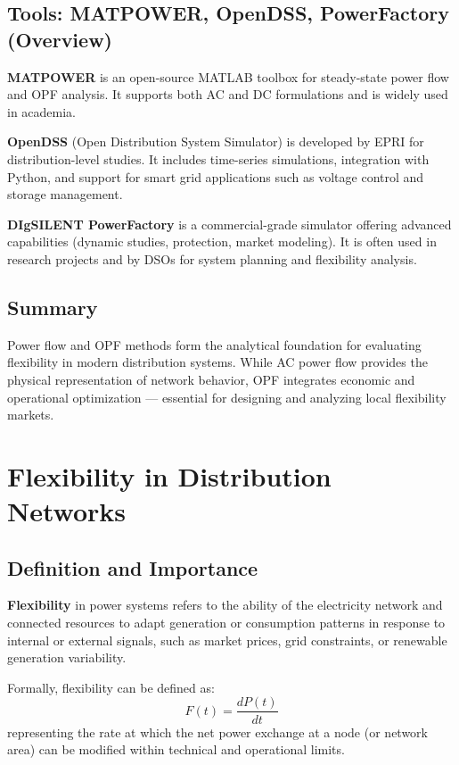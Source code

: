 \documentclass[11pt]{article}
\begin{document}
	\subsection{Tools: MATPOWER, OpenDSS, PowerFactory (Overview)}
	
	\textbf{MATPOWER} \cite{zimmerman2011matpower} is an open-source MATLAB toolbox for steady-state power flow and OPF analysis.  
	It supports both AC and DC formulations and is widely used in academia.
	
	\textbf{OpenDSS} (Open Distribution System Simulator) is developed by EPRI for distribution-level studies.  
	It includes time-series simulations, integration with Python, and support for smart grid applications such as voltage control and storage management.
	
	\textbf{DIgSILENT PowerFactory} is a commercial-grade simulator offering advanced capabilities (dynamic studies, protection, market modeling).  
	It is often used in research projects and by DSOs for system planning and flexibility analysis.
	
	\subsection*{Summary}
	
	Power flow and OPF methods form the analytical foundation for evaluating flexibility in modern distribution systems.  
	While AC power flow provides the physical representation of network behavior, OPF integrates economic and operational optimization — essential for designing and analyzing local flexibility markets.
	
	
	\section{Flexibility in Distribution Networks}
	
	\subsection{Definition and Importance}
	
	\textbf{Flexibility} in power systems refers to the ability of the electricity network and connected resources to adapt generation or consumption patterns in response to internal or external signals, such as market prices, grid constraints, or renewable generation variability.
	
	Formally, flexibility can be defined as:
	\[
	F(t) = \frac{dP(t)}{dt}
	\]
	representing the rate at which the net power exchange at a node (or network area) can be modified within technical and operational limits.
	
\end{document}

